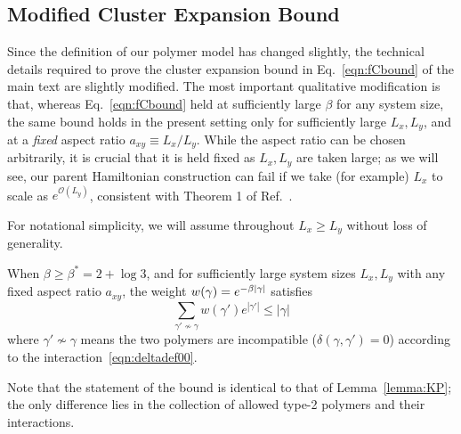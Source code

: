  

\subsection{Modified Cluster Expansion Bound}
Since the definition of our polymer model has changed slightly, the technical details required to prove the cluster expansion bound in Eq.~\eqref{eqn:fCbound} of the main text are slightly modified. The most important qualitative modification is that, whereas Eq.~\eqref{eqn:fCbound} held at sufficiently large $\beta$ for any system size, the same bound holds in the present setting only for sufficiently large $L_x, L_y$, and at a \emph{fixed} aspect ratio $a_{xy} \equiv L_x / L_y$. While the aspect ratio can be chosen arbitrarily, it is crucial that it is held fixed as $L_x, L_y$ are taken large; as we will see, our parent Hamiltonian construction can fail if we take (for example) $L_x$ to scale as $e^{\mathcal{O}(L_y)}$, consistent with Theorem 1 of Ref.~.

For notational simplicity, we will assume throughout $L_x \geq L_y$ without loss of generality.

\begin{lemma}
\label{lemma:KP00}
When $\beta \geq \beta^\ast = 2 +\log 3$, and for sufficiently large system sizes $L_x, L_y$ with any fixed aspect ratio $a_{xy}$, the weight $w(\gamma) = e^{-\beta \abs{\gamma}}$ satisfies
\begin{equation}
    \sum_{\gamma' \nsim \gamma} w(\gamma') e^{|\gamma'|} \leq |\gamma|
\end{equation}
where $\gamma' \nsim \gamma$ means the two polymers are incompatible ($\delta(\gamma, \gamma') = 0$) according to the interaction~\eqref{eqn:deltadef00}. 
\end{lemma}
Note that the statement of the bound is identical to that of Lemma~\ref{lemma:KP}; the only difference lies in the collection of allowed type-2 polymers and their interactions.

